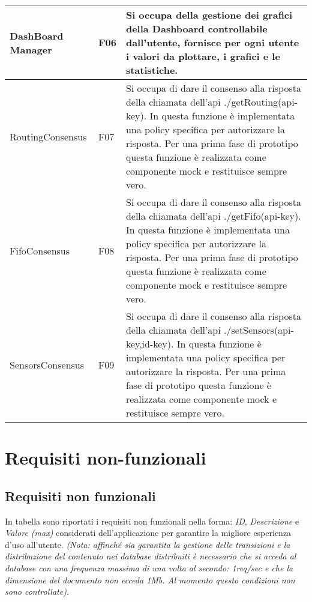 \documentclass[onecolumn,a4paper]{article}
\begin{document}
\begin{longtable}{|l|l|p{8.5cm}|}
\hline
DashBoard Manager & F06 & Si occupa della gestione dei grafici della Dashboard controllabile dall'utente, fornisce per ogni utente i valori da plottare, i grafici e le statistiche.\\
\hline
RoutingConsensus & F07 & Si occupa di dare il consenso alla risposta della chiamata dell'api ./getRouting(api-key). In questa funzione è implementata una policy specifica per autorizzare la risposta. Per una prima fase di prototipo questa funzione è realizzata come componente mock e restituisce sempre vero.\\
\hline
FifoConsensus & F08 & Si occupa di dare il consenso alla risposta della chiamata dell'api ./getFifo(api-key). In questa funzione è implementata una policy specifica per autorizzare la risposta. Per una prima fase di prototipo questa funzione è realizzata come componente mock e restituisce sempre vero.\\
\hline
SensorsConsensus & F09 & Si occupa di dare il consenso alla risposta della chiamata dell'api ./setSensors(api-key,id-key). In questa funzione è implementata una policy specifica per autorizzare la risposta. Per una prima fase di prototipo questa funzione è realizzata come componente mock e restituisce sempre vero.\\
\hline
\end{longtable}
\section{Requisiti non-funzionali}
\label{sec:org7979a35}
\subsection{Requisiti non funzionali}
\label{sec:org2c0353a}
In tabella sono riportati i requisiti non funzionali nella forma: \emph{ID}, \emph{Descrizione} e \emph{Valore (max)} considerati dell'applicazione per garantire la migliore esperienza d'uso all'utente. \emph{(Nota: affinché sia garantita la gestione delle transizioni e la distribuzione del contenuto nei database distribuiti è necessario che si acceda al database con una frequenza massima di una volta al secondo: 1req/sec e che la dimensione del documento non ecceda 1Mb. Al momento questo condizioni non sono controllate).}  
\end{document}
